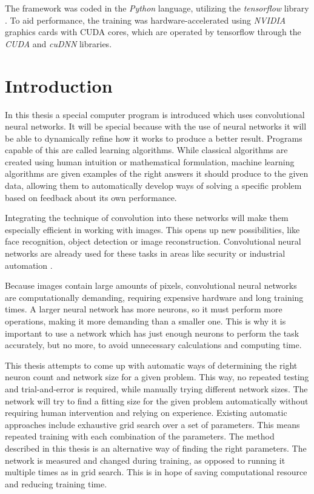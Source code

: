 \documentclass[12pt]{report}
\begin{document}
The framework was coded in the \textit{Python} language, utilizing the \textit{tensorflow} library \cite{tensorflow2015-whitepaper}. To aid performance, the training was hardware-accelerated using \textit{NVIDIA} graphics cards with CUDA cores, which are operated by tensorflow through the \textit{CUDA} and \textit{cuDNN} libraries.

\chapter*{Introduction}

In this thesis a special computer program is introduced which uses convolutional neural networks. It will be special because with the use of neural networks it will be able to dynamically refine how it works to produce a better result. Programs capable of this are called learning algorithms. While classical algorithms are created using human intuition or mathematical formulation, machine learning algorithms are given examples of the right answers it should produce to the given data, allowing them to automatically develop ways of solving a specific problem based on feedback about its own performance.

Integrating the technique of convolution into these networks will make them especially efficient in working with images. This opens up new possibilities, like face recognition, object detection or image reconstruction. Convolutional neural networks are already used for these tasks in areas like security or industrial automation \cite{applications}.

Because images contain large amounts of pixels, convolutional neural networks are computationally demanding, requiring expensive hardware and long training times. A larger neural network has more neurons, so it must perform more operations, making it more demanding than a smaller one. This is why it is important to use a network which has just enough neurons to perform the task accurately, but no more, to avoid unnecessary calculations and computing time.

This thesis attempts to come up with automatic ways of determining the right neuron count and network size for a given problem. This way, no repeated testing and trial-and-error is required, while manually trying different network sizes. The network will try to find a fitting size for the given problem automatically without requiring human intervention and relying on experience. Existing automatic approaches include exhaustive grid search over a set of parameters. This means repeated training with each combination of the parameters. The method described in this thesis is an alternative way of finding the right parameters. The network is measured and changed during training, as opposed to running it multiple times as in grid search. This is in hope of saving computational resource and reducing training time.
\end{document}
